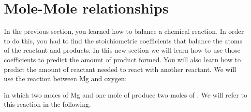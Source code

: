 \documentclass[main.tex]{subfiles}
\begin{document}
\section{Mole-Mole relationships}
In the previous section, you learned how to balance a chemical reaction. In order to do this, you had to find the stoichiometric coefficients that balance the atoms of the reactant and products. In this new section we will learn how to use those coefficients to predict the amount of product formed. You will also learn how to predict the amount of reactant needed to react with another reactant. We will use the reaction between Mg and oxygen:
\begin{center}\end{center}
in which two moles of Mg and one mole of  produce two moles of . We will refer to this reaction in the following.
\sloppy 
\end{document}
